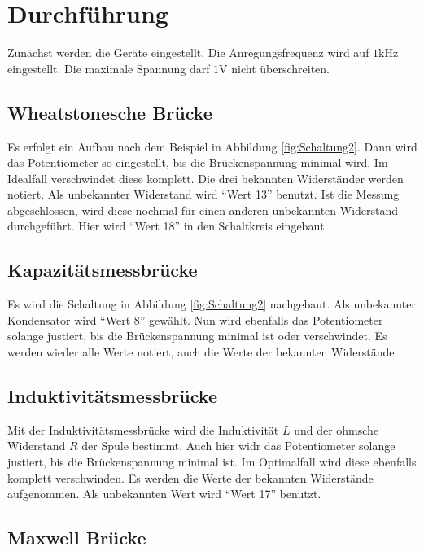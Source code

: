 \section{Durchführung}
\label{sec:Durchführung}

Zunächst werden die Geräte eingestellt.
Die Anregungsfrequenz wird auf $1 \si{\kilo\hertz}$ eingestellt.
Die maximale Spannung darf $1 \si{\volt}$ nicht überschreiten.

\subsection{Wheatstonesche Brücke} \label{sec:wheatdurchf}
Es erfolgt ein Aufbau nach dem Beispiel in Abbildung \ref{fig:Schaltung2}.
Dann wird das Potentiometer so eingestellt, bis die Brückenspannung minimal wird.
Im Idealfall verschwindet diese komplett.
Die drei bekannten Widerständer werden notiert.
Als unbekannter Widerstand wird \enquote{Wert 13} benutzt.
Ist die Messung abgeschlossen, wird diese nochmal für einen anderen unbekannten Widerstand durchgeführt.
Hier wird \enquote{Wert 18} in den Schaltkreis eingebaut.

\subsection{Kapazitätsmessbrücke} \label{sec:kapazdurchf}

Es wird die Schaltung in Abbildung \ref{fig:Schaltung2} nachgebaut.
Als unbekannter Kondensator wird \enquote{Wert 8} gewählt.
Nun wird ebenfalls das Potentiometer solange justiert, bis die Brückenspannung minimal ist oder verschwindet.
Es werden wieder alle Werte notiert, auch die Werte der bekannten Widerstände.

\subsection{Induktivitätsmessbrücke} \label{sec:induktdurchf}

Mit der Induktivitätsmessbrücke wird die Induktivität $L$ und der ohmsche Widerstand $R$ der Spule bestimmt.
Auch hier widr das Potentiometer solange justiert, bis die Brückenspannung minimal ist.
Im Optimalfall wird diese ebenfalls komplett verschwinden.
Es werden die Werte der bekannten Widerstände aufgenommen.
Als unbekannten Wert wird \enquote{Wert 17} benutzt.

\subsection{Maxwell Brücke} 

